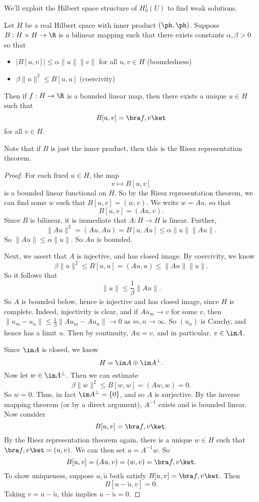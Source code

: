 \documentclass[a4paper]{article}
\begin{document}
We'll exploit the Hilbert space structure of $H_0^1(U)$ to find weak solutions.

\begin{thm}
  Let $H$ be a real Hilbert space with inner product $(\ph, \ph)$. Suppose $B: H \times H \to \R$ is a bilinear mapping such that there exists constants $\alpha, \beta > 0$ so that
  \begin{itemize}
    \item $|B[u, v]| \leq \alpha \|u\| \|v\|$ for all $u, v \in H$ \hfill (boundedness)
    \item $\beta\|u\|^2 \leq B[u, u]$ \hfill (coercivity)
  \end{itemize}
  Then if $f: H \to \R$ is a bounded linear map, then there exists a unique $u \in H$ such that
  \[
    B[u, v] = \bra f, v\ket
  \]
  for all $v \in H$.
\end{thm}
Note that if $B$ is just the inner product, then this is the Riesz representation theorem.

\begin{proof}
  For each fixed $u \in H$, the map
  \[
    v \mapsto B[u, v]
  \]
  is a bounded linear functional on $H$. So by the Riesz representation theorem, we can find some $w$ such that $B[u, v] = (w, v)$. We write $w = Au$, so that
  \[
    B[u, v] = (Au, v).
  \]
  Since $B$ is bilinear, it is immediate that $A: H \to H$ is linear. Further,
  \[
    \|Au\|^2 = (Au, Au) = B[u, Au]\leq \alpha \|u\| \|Au\|.
  \]
  So $\|Au\| \leq \alpha \|u\|$. So $Au$ is bounded.

  Next, we assert that $A$ is injective, and has closed image. By coercivity, we know
  \[
    \beta \|u\|^2 \leq B[u, u] = (Au, u) \leq \|A u\| \|u\|.
  \]
  So it follows that
  \[
    \|u\| \leq \frac{1}{\beta} \|Au\|.
  \]
  So $A$ is bounded below, hence is injective and has closed image, since $H$ is complete. Indeed, injectivity is clear, and if $A u_m \to v$ for some $v$, then $\|u_m - u_n\| \leq \frac{1}{\beta} \|A u_m - A u_n\| \to 0$ as $m, n \to \infty$. So $(u_n)$ is Cauchy, and hence has a limit $u$. Then by continuity, $A u = v$, and in particular, $v \in \im A$.

  Since $\im A$ is closed, we know
  \[
    H = \im A \oplus \im A ^\perp.
  \]
  Now let $w \in \im A^\perp$. Then we can estimate
  \[
    \beta\|w\|^2 \leq B[w, w] = (Aw, w) = 0.
  \]
  So $w = 0$. Thus, in fact $\im A^\perp = \{0\}$, and so $A$ is surjective. By the inverse mapping theorem (or by a direct argument), $A^{-1}$ exists and is bounded linear. Now consider
  \[
    B[u, v] = \bra f, v\ket.
  \]
  By the Riesz representation theorem again, there is a unique $w \in H$ such that $\bra f, v\ket = (u, v)$. We can then set $u = A^{-1}w$. So
  \[
    B[u, v] = (Au, v) = (w, v) = \bra f, v\ket.
  \]
  To show uniqueness, suppose $u, \tilde{u}$ both satisfy $B[u, v] = \bra f, v\ket$. Then
  \[
    B[u - \tilde{u}, v] = 0.
  \]
  Taking $v = u - \tilde{u}$, this implies $u - \tilde{u} = 0$.
\end{proof}
\end{document}
